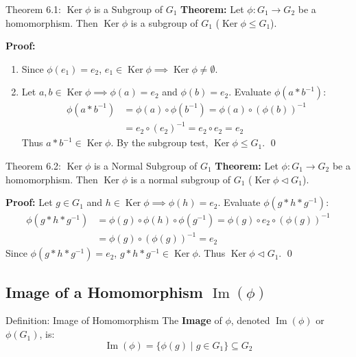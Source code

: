 \documentclass[11pt,a4paper]{article}
\begin{document}
\begin{exbox}{Theorem 6.1: $\operatorname{Ker} \phi$ is a Subgroup of $G_1$}
\textbf{Theorem:} Let $\phi: G_1 \to G_2$ be a homomorphism. Then $\operatorname{Ker} \phi$ is a subgroup of $G_1$ ($\operatorname{Ker} \phi \le G_1$).

\textbf{Proof:}
\begin{enumerate}
    \item Since $\phi(e_1) = e_2$, $e_1 \in \operatorname{Ker} \phi \implies \operatorname{Ker} \phi \neq \emptyset$.
    \item Let $a, b \in \operatorname{Ker} \phi \implies \phi(a) = e_2$ and $\phi(b) = e_2$. Evaluate $\phi(a * b^{-1})$:
    \begin{align}
        \phi(a * b^{-1}) &= \phi(a) \circ \phi(b^{-1}) = \phi(a) \circ (\phi(b))^{-1} \nonumber \\
        &= e_2 \circ (e_2)^{-1} = e_2 \circ e_2 = e_2
    \end{align}
    Thus $a * b^{-1} \in \operatorname{Ker} \phi$. By the subgroup test, $\operatorname{Ker} \phi \le G_1$. \qed
\end{enumerate}
\end{exbox}

\begin{exbox}{Theorem 6.2: $\operatorname{Ker} \phi$ is a Normal Subgroup of $G_1$}
\textbf{Theorem:} Let $\phi: G_1 \to G_2$ be a homomorphism. Then $\operatorname{Ker} \phi$ is a normal subgroup of $G_1$ ($\operatorname{Ker} \phi \triangleleft G_1$).

\textbf{Proof:}
Let $g \in G_1$ and $h \in \operatorname{Ker} \phi \implies \phi(h) = e_2$.
Evaluate $\phi(g * h * g^{-1})$:
\begin{align}
    \phi(g * h * g^{-1}) &= \phi(g) \circ \phi(h) \circ \phi(g^{-1}) = \phi(g) \circ e_2 \circ (\phi(g))^{-1} \nonumber \\
    &= \phi(g) \circ (\phi(g))^{-1} = e_2
\end{align}
Since $\phi(g * h * g^{-1}) = e_2$, $g * h * g^{-1} \in \operatorname{Ker} \phi$.
Thus $\operatorname{Ker} \phi \triangleleft G_1$. \qed
\end{exbox}

\subsection{Image of a Homomorphism \texorpdfstring{$\operatorname{Im}(\phi)$}{Im(phi)}}

\begin{defbox}{Definition: Image of Homomorphism}
The \textbf{Image} of $\phi$, denoted $\operatorname{Im}(\phi)$ or $\phi(G_1)$, is:
\begin{equation}
    \operatorname{Im}(\phi) = \{ \phi(g) \mid g \in G_1 \} \subseteq G_2
\end{equation}
\end{defbox}
\end{document}
